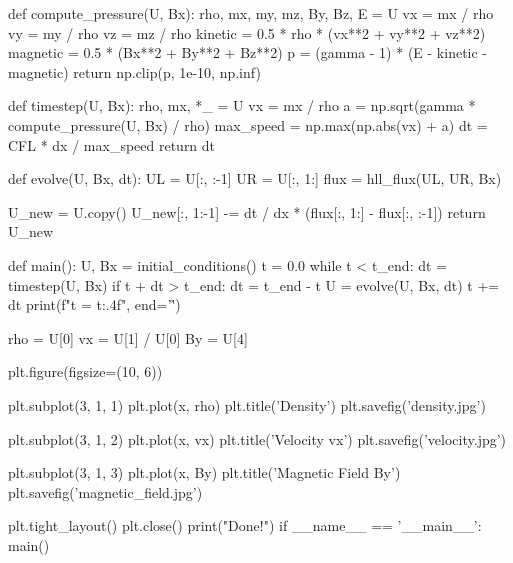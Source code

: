 \documentclass[12pt]{article}
\begin{document}
\begin{python}
def compute_pressure(U, Bx):
    rho, mx, my, mz, By, Bz, E = U
    vx = mx / rho
    vy = my / rho
    vz = mz / rho
    kinetic = 0.5 * rho * (vx**2 + vy**2 + vz**2)
    magnetic = 0.5 * (Bx**2 + By**2 + Bz**2)
    p = (gamma - 1) * (E - kinetic - magnetic)
    return np.clip(p, 1e-10, np.inf)

def timestep(U, Bx):
    rho, mx, *_ = U
    vx = mx / rho
    a = np.sqrt(gamma * compute_pressure(U, Bx) / rho)
    max_speed = np.max(np.abs(vx) + a)
    dt = CFL * dx / max_speed
    return dt

def evolve(U, Bx, dt):
    UL = U[:, :-1]
    UR = U[:, 1:]
    flux = hll_flux(UL, UR, Bx)

    U_new = U.copy()
    U_new[:, 1:-1] -= dt / dx * (flux[:, 1:] - flux[:, :-1])
    return U_new

def main():
    U, Bx = initial_conditions()
    t = 0.0
    while t < t_end:
        dt = timestep(U, Bx)
        if t + dt > t_end:
            dt = t_end - t
        U = evolve(U, Bx, dt)
        t += dt
        print(f"t = {t:.4f}", end='\r')


    rho = U[0]
    vx = U[1] / U[0]
    By = U[4]


    plt.figure(figsize=(10, 6))

    plt.subplot(3, 1, 1)
    plt.plot(x, rho)
    plt.title('Density')
    plt.savefig('density.jpg') 

    plt.subplot(3, 1, 2)
    plt.plot(x, vx)
    plt.title('Velocity vx')
    plt.savefig('velocity.jpg') 

    plt.subplot(3, 1, 3)
    plt.plot(x, By)
    plt.title('Magnetic Field By')
    plt.savefig('magnetic_field.jpg')

    plt.tight_layout()
    plt.close() 
    print("Done!")
if __name__ == '__main__':
    main()

\end{python}
\end{document}
